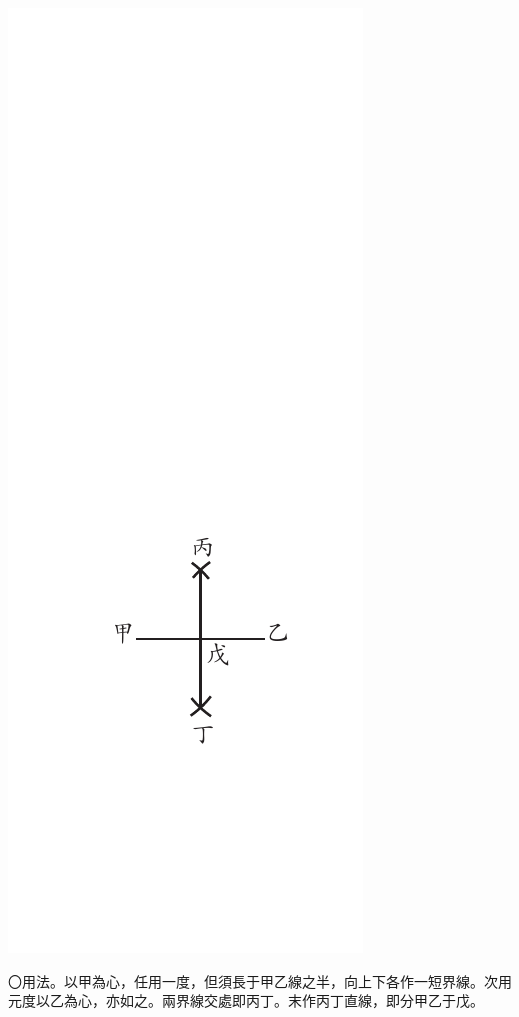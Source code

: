 \documentclass[12pt,b5paper,landscape]{article}
\newcommand{\bcom}[1]{〇#1}
\begin{document}
\begin{multicols}{2}
\begin{center}
\includegraphics[angle=90]{eu49}
\end{center}
\bcom{用法。以甲為心，任用一度，但須長于甲乙線之半，向上下各作一短界線。次用元度以乙為心，亦如之。兩界線交處即丙丁。末作丙丁直線，即分甲乙于戊。}


\end{multicols}
\end{document}
